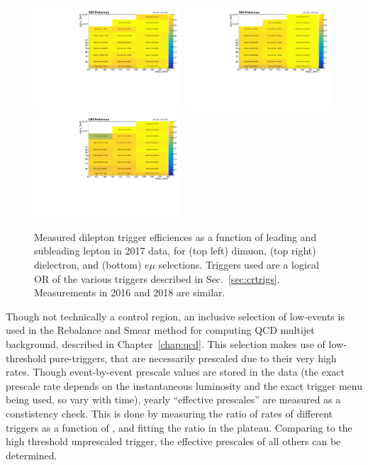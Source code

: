 \begin{figure}[t]
  \begin{center}
    \includegraphics[width=0.49\textwidth]{figs/event_selection/trigeff_dilep_mm_2d_ht_2017fullYear.pdf}
    \includegraphics[width=0.49\textwidth]{figs/event_selection/trigeff_dilep_ee_2d_ht_2017fullYear.pdf} \\
    \includegraphics[width=0.49\textwidth]{figs/event_selection/trigeff_dilep_em_2d_ht_2017fullYear.pdf}
    \caption{Measured dilepton trigger efficiences as a function of leading and subleading lepton \pt
      in 2017 data, for (top left) dimuon, (top right) dielectron,
      and (bottom) $e\mu$ selections. Triggers used are a logical OR of the various triggers described
      in Sec.~\ref{sec:crtrigs}. Measurements in 2016 and 2018 are similar.
            }
    \label{fig:trigmeas_dilep}
  \end{center}
\end{figure}

Though not technically a control region, an inclusive selection of low-\Ht events is used in the Rebalance and
Smear method for computing QCD multijet background, described in Chapter~\ref{chap:qcd}. This selection
makes use of low-threshold pure-\Ht triggers, that are necessarily prescaled due to their very
high rates. Though event-by-event prescale values are stored in the data (the exact prescale rate
depends on the instantaneous luminosity and the exact trigger menu being used, so vary with time),
yearly ``effective prescales'' are measured as a constistency check. This is done by measuring the
ratio of rates of different triggers as a function of \Ht, and fitting the ratio
in the plateau. Comparing to the high threshold unprescaled trigger, the effective prescales of
all others can be determined.

